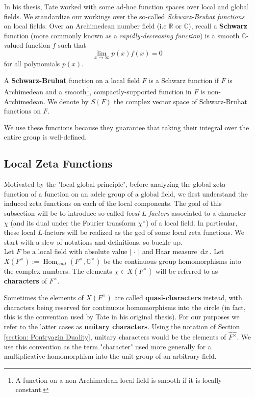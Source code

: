 \documentclass[11pt, x11names]{book}
\newcommand{\rr}{\mathbb{R}}
\newcommand{\cc}{\mathbb{C}}
\newcommand{\abs}[1]{\left| \, #1  \,\right|}
\renewcommand{\hat}{\widehat}
\DeclareMathOperator{\Hom}{Hom}
\newcommand{\dx}{\, \mathrm{d}x \ }
\begin{document}
In his thesis, Tate worked with some ad-hoc function spaces over local and global fields. We standardize our workings over the so-called \textit{Schwarz-Bruhat functions} on local fields. Over an Archimedean number field (i.e $\rr$ or $\cc$), recall a \textbf{Schwarz} function (more commonly known as a \textit{rapidly-decreasing function}) is a smooth $\cc$-valued function $f$ such that
\begin{equation*}
    \lim_{x \to \infty} p(x)f(x) = 0
\end{equation*}
for all polynomials $p(x)$.
\begin{defn}
\label{def: Schwarz-Bruhat functions}
A \textbf{Schwarz-Bruhat} function on a local field $F$ is a Schwarz function if $F$ is Archimedean and a smooth\footnote{A function on a non-Archimedean local field is smooth if it is locally constant.}, compactly-supported function in $F$ is non-Archimedean. We denote by $S(F)$ the complex vector space of Schwarz-Bruhat functions on $F$.
\end{defn}
We use these functions because they guarantee that taking their integral over the entire group is well-defined.

\subsection{Local Zeta Functions}
Motivated by the "local-global principle", before analyzing the global zeta function of a function on an adele group of a global field, we first understand the induced zeta functions on each of the local components. The goal of this subsection will be to introduce so-called \textit{local $L$-factors} associated to a character $\chi$ (and its dual under the Fourier transform $\chi^\lor$) of a local field. In particular, these local $L$-factors will be realized as the gcd of some local zeta functions. We start with a slew of notations and definitions, so buckle up.\\

Let $F$ be a local field with absolute value $\abs{\cdot}$ and Haar measure $\dx$.
Let $X(F^\times) := \Hom_{cont}(F^\times, \cc^\times)$ be the continuous group homomorphisms into the complex numbers. The elements $\chi \in X(F^\times)$ will be referred to as \textbf{characters} of $F^\times$.
\begin{remark}
    Sometimes the elements of $X(F^\times)$ are called \textbf{quasi-characters} instead, with characters being reserved for continuous homomorphisms into the circle (in fact, this is the convention used by Tate in his original thesis). For our purposes we refer to the latter cases as \textbf{unitary characters}. Using the notation of Section \ref{section: Pontryagin Duality}, unitary characters would be the elements of $\hat{F^\times}$. We use this convention as the term "character" used more generally for a multiplicative homomorphism into the unit group of an arbitrary field.
\end{remark}
\end{document}

